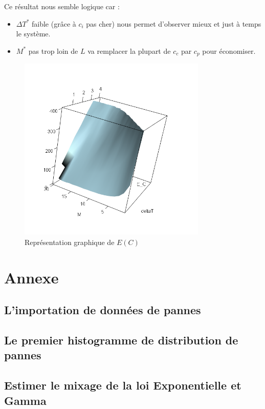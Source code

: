 \documentclass[10pt,a4paper]{article}
\begin{document}
Ce résultat nous semble logique car :
\begin{itemize}
    \item $\Delta T^*$ faible (grâce à $c_i$ pas cher) nous permet d'observer mieux et just à temps le système.
    \item $M^*$ pas trop loin de $L$ va remplacer la plupart de $c_c$ par $c_p$ pour économiser.
\end{itemize}

\begin{figure}
    \centering
    \caption{Représentation graphique de $E(C)$}
    \label{fig:e_c}
    \includegraphics[width=0.8\textwidth]{img/E_C_degrad.png}
\end{figure}

\clearpage
\section{Annexe}
\subsection{L'importation de données de pannes}
\label{annexe:import_pannes}

\subsection{Le premier histogramme de distribution de pannes}
\label{annexe:premier_histo}

\subsection{Estimer le mixage de la loi Exponentielle et Gamma}
\label{annexe:em_exp_gamma}

\end{document}
